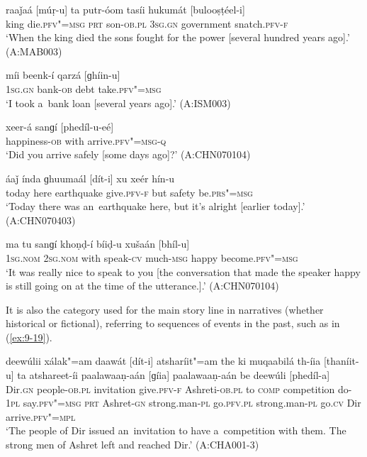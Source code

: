 \begin{exe}
\ex
\label{ex:9-14}
\gll raaǰaá [múṛ-u] ta putr-óom tasíi hukumát [bulooṣṭéel-i] \\
king die.\textsc{pfv"=msg} \textsc{prt} son-\textsc{ob.pl} \textsc{3sg.gn} government snatch.\textsc{pfv-f} \\
\glt `When the king died the sons fought for the power [several hundred years ago].' (A:MAB003)

\ex
\label{ex:9-15}
\gll míi beenk-í qarzá [ɡhíin-u]  \\
\textsc{1sg.gn} bank-\textsc{ob} debt take.\textsc{pfv"=msg} \\
\glt `I took a~bank loan [several years ago].' (A:ISM003) 

\ex
\label{ex:9-16}
\gll xeer-á sanɡí [phedíl-u-eé] \\
happiness-\textsc{ob} with arrive.\textsc{pfv"=msg-q} \\
\glt `Did you arrive safely [some days ago]?' (A:CHN070104)

\ex
\label{ex:9-17}
\gll áaǰ índa ɡhuumaál [dít-i] xu xeér hín-u \\
today here earthquake give.\textsc{pfv-f} but safety be.\textsc{prs"=msg}  \\
\glt `Today there was an~earthquake here, but it's alright [earlier today].' (A:CHN070403)

\ex
\label{ex:9-18}
\gll ma tu sanɡí khoṇḍ-í bíiḍ-u xušaán [bhíl-u] \\
\textsc{1sg.nom} \textsc{2}\textsc{sg.nom} with speak-\textsc{cv} much-\textsc{msg} happy become.\textsc{pfv"=msg} \\
\glt `It was really nice to speak to you [the conversation that made the speaker happy is still going on at the time of the utterance.].' (A:CHN070104)
\end{exe}

It is also the category used for the main story line in narratives (whether historical or fictional), referring to sequences of events in the past, such as in (\ref{ex:9-19}).

\begin{exe}
\ex
\label{ex:9-19}
\gll deewúlii xálak"=am daawát [dít-i] atsharíit"=am the ki muqaabilá
th-íia  [thaníit-u] ta atshareet-íi paalawaaṇ-aán [ɡíia] paalawaaṇ-aán be deewúli [phedíl-a] \\
Dir.\textsc{gn} people-\textsc{ob.pl} invitation give.\textsc{pfv-f}  Ashreti-\textsc{ob.pl} to \textsc{comp} competition do-\textsc{1pl}  say.\textsc{pfv"=msg} \textsc{prt} Ashret-\textsc{gn} strong.man-\textsc{pl} go.\textsc{pfv.pl}  strong.man-\textsc{pl} go.\textsc{cv} Dir arrive.\textsc{pfv"=mpl} \\
\glt `The people of Dir issued an~invitation to have a~competition with them. The strong men of Ashret left and reached Dir.' (A:CHA001-3)
\end{exe}

